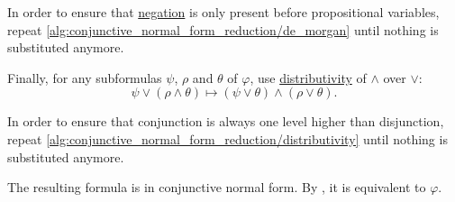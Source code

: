 \begin{algorithm}
\begin{AlgEnum}
    In order to ensure that \hyperref[def:propositional_alphabet/negation]{negation} is only present before propositional variables, repeat \ref{alg:conjunctive_normal_form_reduction/de_morgan} until nothing is substituted anymore.

     Finally, for any subformulas \( \psi \), \( \rho \) and \( \theta \) of \( \varphi \), use \hyperref[eq:def:distributive_lattice/distributivity]{distributivity} of \( \wedge \) over \( \vee \):
    \begin{equation*}
      \psi \vee (\rho \wedge \theta) \mapsto (\psi \vee \theta) \wedge (\rho \vee \theta).
    \end{equation*}

    In order to ensure that conjunction is always one level higher than disjunction, repeat \ref{alg:conjunctive_normal_form_reduction/distributivity} until nothing is substituted anymore.
  \end{AlgEnum}

  The resulting formula is in conjunctive normal form. By , it is equivalent to \( \varphi \).
\end{algorithm}
